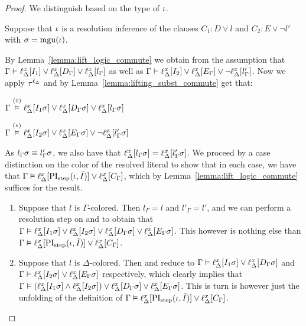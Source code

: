 \begin{proof}
	We distinguish based on the type of $\iota$.
	\begin{indproof}
			Suppose that $\iota$ is a resolution inference of the clauses $C_1: D \lor l$ and $C_2: E \lor \lnot l'$ with $\sigma = \operatorname{mgu}(\iota)$.

			By Lemma~\ref{lemma:lift_logic_commute} we obtain from the assumption that
			$\Gamma \vDash \ell_{\Delta}^{x}[I_1] \lor \ell_{\Delta}^{x}[D_\Gamma] \lor \ell_{\Delta}^{x}[l_\Gamma]$
			as well as 
			$\Gamma \vDash \ell_{\Delta}^{x}[I_2] \lor \ell_{\Delta}^{x}[E_\Gamma] \lor \lnot \ell_{\Delta}^{x}[l'_\Gamma]$.
			Now we apply $\tau^{\ell_\Delta}$ and by Lemma~\ref{lemma:lifting_subst_commute} get that:

			$\Gamma \stackrel{(\circ)}{\vDash} \ell_{\Delta}^{x}[I_1\sigma] \lor \ell_{\Delta}^{x}[D_\Gamma\sigma] \lor \ell_{\Delta}^{x}[l_\Gamma\sigma]$

			$\Gamma \stackrel{(*)}{\vDash} \ell_{\Delta}^{x}[I_2\sigma] \lor \ell_{\Delta}^{x}[E_\Gamma\sigma] \lor \lnot \ell_{\Delta}^{x}[l'_\Gamma\sigma]$

			As $l_\Gamma\sigma \equiv l'_\Gamma\sigma$,
			we also have that
			$\ell_{\Delta}^{x}[l_\Gamma\sigma] = \ell_{\Delta}^{x}[l'_\Gamma\sigma]$.
			We proceed by a case distinction on the color of the resolved literal to show that in each case, we have that
			$\Gamma \vDash \ell_{\Delta}^{x}[\operatorname{PI}_{\mathrm{step}}(\iota, \bar I)] \lor \ell_{\Delta}^{x}[C_\Gamma]$,
			which by Lemma~\ref{lemma:lift_logic_commute} suffices for the result.
			\begin{enumerate}
				\item Suppose that $l$ is $\Gamma$-colored.
					Then $l_\Gamma = l$ and $l'_\Gamma = l'$, and we can perform a resolution step on \markA{} and \markB{} to obtain that
					$\Gamma \vDash
					\ell_{\Delta}^{x}[I_1\sigma] \lor
					\ell_{\Delta}^{x}[I_2\sigma] \lor 
					\ell_{\Delta}^{x}[D_\Gamma\sigma]  \lor
					\ell_{\Delta}^{x}[E_\Gamma\sigma]$.
					This however is nothing else than $\Gamma \vDash \ell_{\Delta}^{x}[\operatorname{PI}_{\mathrm{step}}(\iota, \bar I)] \lor \ell_{\Delta}^{x}[C_\Gamma]$.

				\item Suppose that $l$ is $\Delta$-colored.
					Then \markA{} and \markB{} reduce to 
					$\Gamma \vDash \ell_{\Delta}^{x}[I_1\sigma] \lor \ell_{\Delta}^{x}[D_\Gamma\sigma]$
					and
					$\Gamma \vDash \ell_{\Delta}^{x}[I_2\sigma] \lor \ell_{\Delta}^{x}[E_\Gamma\sigma]$
					respectively,
					which clearly implies that 
					$\Gamma \vDash \left(\ell_{\Delta}^{x}[I_1\sigma] \land \ell_{\Delta}^{x}[I_2\sigma]\right) \lor \ell_{\Delta}^{x}[D_\Gamma\sigma] \lor \ell_{\Delta}^{x}[E_\Gamma\sigma]$.
					This is turn is however just the unfolding of the definition of
					$\Gamma \vDash \ell_{\Delta}^{x}[\operatorname{PI}_{\mathrm{step}}(\iota, \bar I)] \lor \ell_{\Delta}^{x}[C_\Gamma]$.


\end{enumerate}
\end{indproof}
\end{proof}
